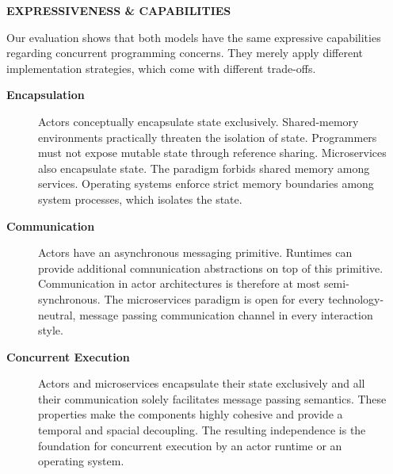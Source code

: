 \documentclass[final,hyperref={pdfpagelabels=true}]{beamer}
\begin{document}
\begin{frame}
  \begin{columns}[t]
    \begin{column}{.04\textwidth}
      \end{column}
    \begin{column}{.43\textwidth}
      \textsf{\textbf{EXPRESSIVENESS \& CAPABILITIES}} \\
      \vspace*{.5\baselineskip}
      {\lmodern
        \begin{justify}
        Our evaluation shows that both models have the same expressive capabilities regarding concurrent programming concerns. They merely apply different implementation strategies, which come with different trade-offs.
        \end{justify}
        
        \vspace*{\baselineskip}

        \begin{description}
          \item[\textbf{\textsf{Encapsulation}}] 
          \begin{justify}
          Actors conceptually encapsulate state exclusively. Shared-memory environments practically threaten the isolation of state. Programmers must not expose mutable state through reference sharing. Microservices also encapsulate state. The paradigm forbids shared memory among services. Operating systems enforce strict memory boundaries among system processes, which isolates the state.
          \end{justify}

          \vspace*{\baselineskip}

          \item[\textbf{\textsf{Communication}}] 
          \begin{justify}
          Actors have an asynchronous messaging primitive. Runtimes can provide additional comnunication abstractions on top of this primitive. Communication in actor architectures is therefore at most semi-synchronous. The microservices paradigm is open for every technology-neutral, message passing communication channel in every interaction style.
          \end{justify}

          \vspace*{\baselineskip}

          \item[\textbf{\textsf{Concurrent Execution}}] 
          \begin{justify}
          Actors and microservices encapsulate their state exclusively and all their communication solely facilitates message passing semantics. These properties make the components highly cohesive and provide a temporal and spacial decoupling. The resulting independence is the foundation for concurrent execution by an actor runtime or an operating system.
          \end{justify}


\end{description}}
\end{column}
\end{columns}
\end{frame}
\end{document}
